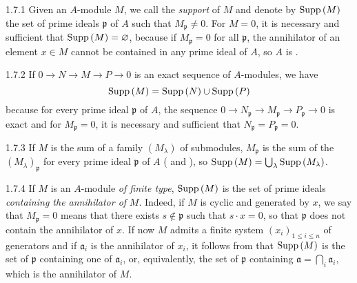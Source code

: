\begin{env}{1.7.1}
\label{env-0.1.7.1}
Given an $A$-module $M$, we call the \emph{support} of $M$ and denote by ${\mathop{\mathrm{Supp}}\nolimits}\,(M)$
the set of prime ideals $\mathfrak{p}$ of $A$ such that $M_\mathfrak{p}\neq 0$. For $M=0$, it
is necessary and sufficient that ${\mathop{\mathrm{Supp}}\nolimits}\,(M)=\varnothing$, because if $M_\mathfrak{p}=0$ for all
$\mathfrak{p}$, the annihilator of an element $x\in M$ cannot be contained in any prime
ideal of $A$, so $A$ is .
\end{env}

\begin{env}{1.7.2}
\label{env-0.1.7.2}
If $0\to N\to M\to P\to 0$ is an exact sequence of $A$-modules, we have
\[
  {\mathop{\mathrm{Supp}}\nolimits}\,(M)={\mathop{\mathrm{Supp}}\nolimits}\,(N)\cup{\mathop{\mathrm{Supp}}\nolimits}\,(P)
\]
because for every prime ideal $\mathfrak{p}$ of $A$, the sequence
${0\to N_\mathfrak{p}\to M_\mathfrak{p}\to P_\mathfrak{p}\to 0}$ is exact 
and for $M_\mathfrak{p}=0$, it is necessary and sufficient that
$N_\mathfrak{p}=P_\mathfrak{p}=0$.
\end{env}

\begin{env}{1.7.3}
\label{env-0.1.7.3}
If $M$ is the sum of a family $(M_\lambda)$ of submodules, $M_\mathfrak{p}$ is the sum
of the $(M_\lambda)_\mathfrak{p}$ for every prime ideal $\mathfrak{p}$ of $A$
( and ), so ${\mathop{\mathrm{Supp}}\nolimits}\,(M)=\bigcup_\lambda{\mathop{\mathrm{Supp}}\nolimits}\,(M_\lambda)$.
\end{env}

\begin{env}{1.7.4}
\label{env-0.1.7.4}
If $M$ is an $A$-module \emph{of finite type}, ${\mathop{\mathrm{Supp}}\nolimits}\,(M)$ is the set of prime
ideals \emph{containing the annihilator of} $M$. Indeed, if $M$ is cyclic and
generated by $x$, we say that $M_\mathfrak{p}=0$ means that there exists
$s\not\in\mathfrak{p}$ such that $s\cdot x=0$, so that $\mathfrak{p}$ does not contain the
annihilator of $x$. If now $M$ admits a finite system $(x_i)_{1\leqslant i\leqslant n}$ of
generators and if $\mathfrak{a}_i$ is the annihilator of $x_i$, it follows from
 that ${\mathop{\mathrm{Supp}}\nolimits}\,(M)$ is the set of $\mathfrak{p}$ containing one of
$\mathfrak{a}_i$, or, equivalently, the set of $\mathfrak{p}$ containing
$\mathfrak{a}=\bigcap_i\mathfrak{a}_i$, which is the annihilator of $M$.
\end{env}

